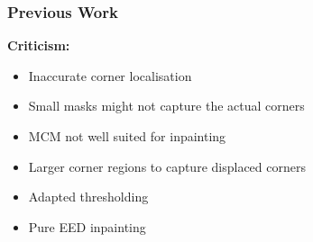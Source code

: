 \documentclass{beamer}
\begin{document}
    \begin{frame}[t]
        \frametitle{Previous Work}
        \textbf{Criticism:}
        \begin{itemize}[<+-|alert@+>]
            \item Inaccurate corner localisation
            \item Small masks might not capture the actual corners
            \item MCM not well suited for inpainting
        \end{itemize}
        \begin{itemize}[]
            \item<4-|alert@4> Larger corner regions to capture displaced corners
            \item<+-|alert@+> Adapted thresholding
            \item<+-|alert@+> Pure EED inpainting
        \end{itemize}
    \end{frame}
\end{document}
